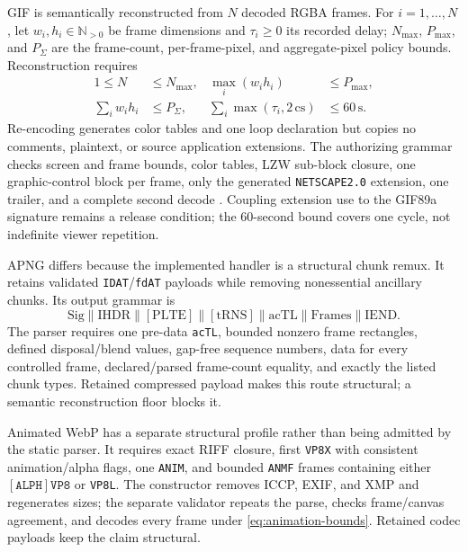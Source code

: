 GIF is semantically reconstructed from \(N\) decoded RGBA frames. For
\(i=1,\ldots,N\), let \(w_i,h_i\in\mathbb N_{>0}\) be frame dimensions and
\(\tau_i\ge0\) its recorded delay; \(N_{\max}\), \(P_{\max}\), and
\(P_{\Sigma}\) are the frame-count, per-frame-pixel, and aggregate-pixel
policy bounds. Reconstruction requires
\begin{equation}
\begin{aligned}
 1\le N&\le N_{\max},&
 \max_i(w_i h_i)&\le P_{\max},\\
 \sum_i w_i h_i&\le P_{\Sigma},&
 \sum_i\max(\tau_i,2\,\mathrm{cs})&\le60\,\mathrm{s}.
\end{aligned}
 \label{eq:animation-bounds}
\end{equation}
Re-encoding generates color tables and one loop declaration but copies no
comments, plaintext, or source application extensions. The authorizing grammar
checks screen and frame bounds, color tables, LZW sub-block closure, one
graphic-control block per frame, only the generated \texttt{NETSCAPE2.0}
extension, one trailer, and a complete second decode \cite{gif89a}. Coupling
extension use to the GIF89a signature remains a release condition; the
60-second bound covers one cycle, not indefinite viewer repetition.

APNG differs because the implemented handler is a structural chunk remux. It
retains validated \texttt{IDAT}/\texttt{fdAT} payloads while removing
nonessential ancillary chunks. Its output grammar is
\begin{equation}
\mathrm{Sig}\parallel\mathrm{IHDR}\parallel[\mathrm{PLTE}]
\parallel[\mathrm{tRNS}]\parallel\mathrm{acTL}
\parallel\mathrm{Frames}\parallel\mathrm{IEND}.
\label{eq:apng-grammar}
\end{equation}
The parser requires one pre-data \texttt{acTL}, bounded nonzero frame
rectangles, defined disposal/blend values, gap-free sequence numbers, data for
every controlled frame, declared/parsed frame-count equality, and exactly the
listed chunk types. Retained compressed payload makes this route structural;
a semantic reconstruction floor blocks it.

Animated WebP has a separate structural profile rather than being admitted by
the static parser. It requires exact RIFF closure, first \texttt{VP8X} with
consistent animation/alpha flags, one \texttt{ANIM}, and bounded
\texttt{ANMF} frames containing either \([\texttt{ALPH}]\texttt{VP8}\) or
\texttt{VP8L}. The constructor removes ICCP, EXIF, and XMP and regenerates
sizes; the separate validator repeats the parse, checks frame/canvas agreement,
and decodes every frame under \cref{eq:animation-bounds}. Retained codec
payloads keep the claim structural.

